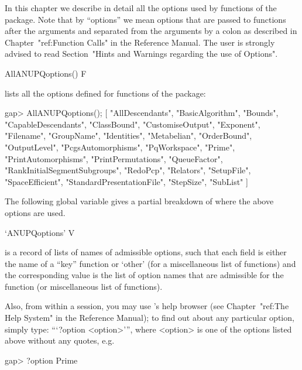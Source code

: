 

In this chapter we describe in detail all the options used  by  functions
of the {\ANUPQ} package. Note that by ``options'' we mean {\GAP}  options
that are passed to functions after the arguments and separated  from  the
arguments by a colon as described in Chapter~"ref:Function Calls" in  the
Reference Manual. The user is strongly advised to read Section~"Hints and
Warnings regarding the use of Options".

\>AllANUPQoptions() F

lists all the {\GAP}  options  defined  for  functions  of  the  {\ANUPQ}
package:

\beginexample
gap> AllANUPQoptions();
[ "AllDescendants", "BasicAlgorithm", "Bounds", "CapableDescendants", 
  "ClassBound", "CustomiseOutput", "Exponent", "Filename", "GroupName", 
  "Identities", "Metabelian", "OrderBound", "OutputLevel", 
  "PcgsAutomorphisms", "PqWorkspace", "Prime", "PrintAutomorphisms", 
  "PrintPermutations", "QueueFactor", "RankInitialSegmentSubgroups", 
  "RedoPcp", "Relators", "SetupFile", "SpaceEfficient", 
  "StandardPresentationFile", "StepSize", "SubList" ]
\endexample

The following global variable gives a  partial  breakdown  of  where  the
above options are used.

\>`ANUPQoptions' V

is a record of lists of names of admissible {\ANUPQ} options, such  that
each field is either the name of a ``key'' {\ANUPQ} function  or  `other'
(for a miscellaneous list of functions) and the  corresponding  value  is
the list of option  names  that  are  admissible  for  the  function  (or
miscellaneous list of functions).

Also, from within a {\GAP} session, you may  use  {\GAP}'s  help  browser
(see Chapter~"ref:The Help System" in the {\GAP}  Reference  Manual);  to
find out about any particular {\ANUPQ} option,  simply  type:  ```?option
<option>''', where <option> is one of the options  listed  above  without
any quotes, e.g.

\begintt
gap> ?option Prime
\endtt

